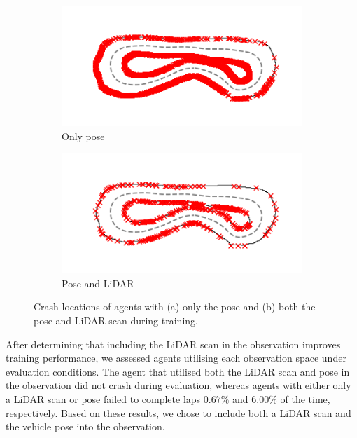 \begin{figure}[htb!]
    \centering
    \begin{subfigure}[htb!]{0.45\textwidth}
        \centering
        \includegraphics[height=.56\linewidth]{contents/chapt5/figs/observation/collision_distributions/crash_location_pose.png}
        \caption{Only pose}
    \end{subfigure}
    \hfill
    \begin{subfigure}[htb!]{0.45\textwidth}
        \centering
        \includegraphics[height=.56\linewidth]{contents/chapt5/figs/observation/collision_distributions/crash_location_both.png}
        \caption{Pose and LiDAR}
    \end{subfigure}
    \hfill
\caption[Locations of crashes during training]{Crash locations of agents with (a) only the pose and (b) both the pose and LiDAR scan during training.}
\label{fig:collision_distribution}
\end{figure}

After determining that including the LiDAR scan in the observation improves training performance, we assessed agents utilising each observation space under evaluation conditions.
The agent that utilised both the LiDAR scan and pose in the observation did not crash during evaluation, whereas agents with either only a LiDAR scan or pose failed to complete laps $0.67\%$ and $6.00\%$ of the time, respectively.
Based on these results, we chose to include both a LiDAR scan and the vehicle pose into the observation.


